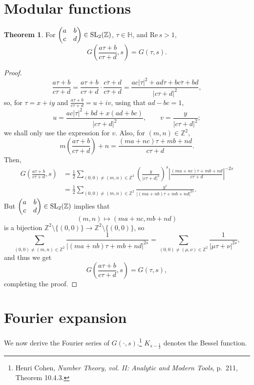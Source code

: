 \documentclass{article}
\def\Re{\ensuremath{\mathrm{Re}}\,}
\newcommand{\SL}{\ensuremath\mathrm{SL}}
\theoremstyle{definition}
\newtheorem{theorem}{Theorem}
\theoremstyle{definition}
\begin{document}
\section{Modular functions}
\begin{theorem}
For $\begin{pmatrix}a&b\\c&d\end{pmatrix} \in \SL_2(\mathbb{Z})$, $\tau \in \mathbb{H}$, and $\Re s>1$,
\[
G\left(\frac{a\tau+b}{c\tau+d},s\right) = G(\tau,s).
\]
\end{theorem}
\begin{proof}
\[
\frac{a\tau+b}{c\tau+d} = \frac{a\tau+b}{c\tau+d}
\cdot \frac{c\overline{\tau}+d}{c\overline{\tau}+d}
=\frac{ac|\tau|^2+ad\tau+bc\overline{\tau}+bd}{|c\tau+d|^2},
\]
so, for $\tau=x+iy$ and $\frac{a\tau+b}{c\tau+d} = u+iv$, using that $ad-bc=1$,
\[
u = \frac{ac|\tau|^2+bd+x(ad+bc)}{|c\tau+d|^2},
\qquad v = \frac{y}{|c\tau+d|^2};
\]
we shall only use the expression for $v$. Also, for $(m,n) \in \mathbb{Z}^2$, 
\[
m\left(\frac{a\tau+b}{c\tau+d} \right) + n = \frac{(ma+nc)\tau+mb+nd}{c\tau+d}.
\]
Then,
\begin{align*}
G\left(\frac{a\tau+b}{c\tau+d},s\right)&=\frac{1}{2}\sum_{(0,0) \neq (m,n) \in \mathbb{Z}^2} \left( \frac{y}{|c\tau+d|^2}\right)^s
 \left| \frac{(ma+nc)\tau+mb+nd}{c\tau+d} \right|^{-2s}\\
&=\frac{1}{2} \sum_{(0,0) \neq (m,n) \in \mathbb{Z}^2} \frac{y^s}{|(ma+nb)\tau+mb+nd|^{2s}}.
\end{align*}
But $\begin{pmatrix}a&b\\c&d\end{pmatrix} \in \SL_2(\mathbb{Z})$ implies that 
\[
(m,n) \mapsto (ma+nc,mb+nd)
\]
is a bijection $\mathbb{Z}^2 \setminus \{(0,0)\} \to \mathbb{Z}^2 \setminus \{(0,0)\}$, so
\[
 \sum_{(0,0) \neq (m,n) \in \mathbb{Z}^2} \frac{1}{|(ma+nb)\tau+mb+nd|^{2s}}
 = \sum_{(0,0) \neq (\mu,\nu) \in \mathbb{Z}^2} \frac{1}{|\mu\tau+\nu|^{2s}},
\]
and thus we get
\[
G\left(\frac{a\tau+b}{c\tau+d},s\right) = G(\tau,s),
\]
completing the proof.
\end{proof}







\section{Fourier expansion}
We now derive the Fourier series of $G(\cdot,s)$.\footnote{Henri Cohen, {\em Number Theory, vol. II: Analytic and Modern Tools}, p.~211, Theorem 10.4.3.}
$K_{s-\frac{1}{2}}$ denotes the Bessel function. 
\end{document}
